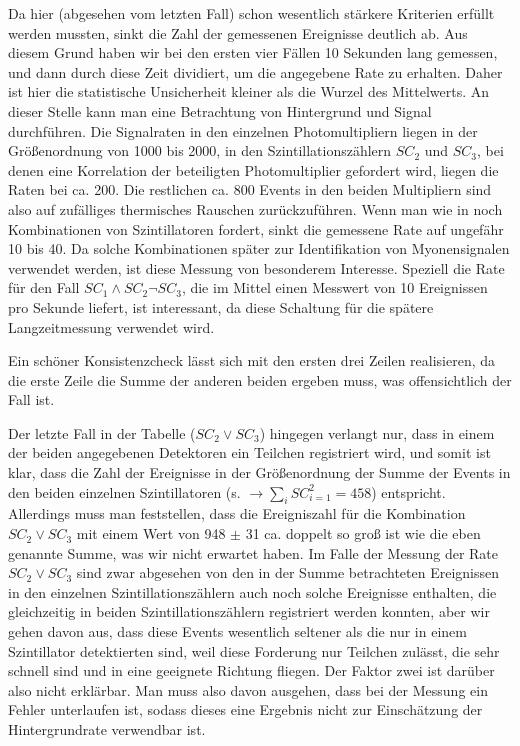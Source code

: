 Da hier (abgesehen vom letzten Fall) schon wesentlich stärkere Kriterien erfüllt
werden mussten, sinkt die Zahl der gemessenen Ereignisse deutlich ab. Aus
diesem Grund haben wir bei den ersten vier Fällen 10 Sekunden lang gemessen,
und dann durch diese Zeit dividiert, um die angegebene Rate zu erhalten. Daher
ist hier die statistische Unsicherheit kleiner als die Wurzel des Mittelwerts.
An dieser Stelle kann man eine Betrachtung von Hintergrund und Signal
durchführen. Die Signalraten in den einzelnen Photomultipliern liegen in der
Größenordnung von 1000 bis 2000, in den Szintillationszählern $SC_2$ und
$SC_3$, bei denen eine Korrelation der beteiligten Photomultiplier gefordert
wird, liegen die Raten bei ca. 200. Die restlichen ca. 800 Events in den beiden
Multipliern sind also auf zufälliges thermisches Rauschen zurückzuführen. Wenn
man wie in  noch Kombinationen von Szintillatoren
fordert, sinkt die gemessene Rate auf ungefähr 10 bis 40. Da solche
Kombinationen später zur Identifikation von Myonensignalen verwendet werden,
ist diese Messung von besonderem Interesse. Speziell die Rate für den Fall $SC_1
\wedge SC_2 \neg SC_3$, die im Mittel einen Messwert von 10 Ereignissen pro
Sekunde liefert, ist interessant, da diese Schaltung für die spätere
Langzeitmessung verwendet wird. 

Ein schöner Konsistenzcheck lässt sich mit den ersten drei Zeilen realisieren,
da die erste Zeile die Summe der anderen beiden ergeben muss, was
offensichtlich der Fall ist.

Der letzte Fall in der Tabelle ($SC_2 \vee SC_3$) hingegen verlangt nur, dass in
einem der
beiden angegebenen Detektoren ein Teilchen registriert wird, und somit ist
klar, dass die Zahl der Ereignisse in der Größenordnung der Summe der Events in
den beiden einzelnen Szintillatoren (s. 
$\rightarrow \sum_i SC_{i=1}^2 = 458 $) entspricht. Allerdings muss man
feststellen, 
dass die Ereigniszahl für die Kombination $SC_2 \vee SC_3$ mit einem Wert von
948 $\pm$ 31 ca. doppelt so groß ist wie die eben genannte Summe, was wir nicht
erwartet haben. Im Falle der Messung der Rate $SC_2 \vee SC_3$ sind zwar
abgesehen von den in der Summe betrachteten Ereignissen in den einzelnen
Szintillationszählern auch noch solche Ereignisse enthalten, die gleichzeitig
in beiden Szintillationszählern registriert werden konnten, aber wir gehen
davon aus, dass diese Events wesentlich seltener als die nur in einem
Szintillator detektierten sind, weil diese Forderung nur Teilchen zulässt, die
sehr schnell sind und in eine geeignete Richtung fliegen. Der Faktor zwei ist
darüber also nicht erklärbar. Man muss also davon ausgehen, dass bei der
Messung ein Fehler unterlaufen ist, sodass dieses eine Ergebnis nicht zur
Einschätzung der Hintergrundrate verwendbar ist.

